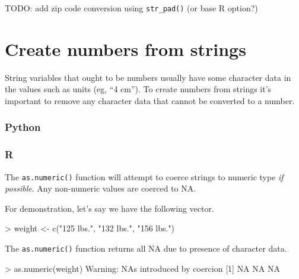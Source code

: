 \documentclass[
]{book}
\newenvironment{Shaded}{\begin{snugshade}}{\end{snugshade}}
\newcommand{\ConstantTok}[1]{\textcolor[rgb]{0.00,0.00,0.00}{#1}}
\newcommand{\DecValTok}[1]{\textcolor[rgb]{0.00,0.00,0.81}{#1}}
\newcommand{\FunctionTok}[1]{\textcolor[rgb]{0.00,0.00,0.00}{#1}}
\newcommand{\NormalTok}[1]{#1}
\newcommand{\OtherTok}[1]{\textcolor[rgb]{0.56,0.35,0.01}{#1}}
\newcommand{\SpecialCharTok}[1]{\textcolor[rgb]{0.00,0.00,0.00}{#1}}
\newcommand{\StringTok}[1]{\textcolor[rgb]{0.31,0.60,0.02}{#1}}
\begin{document}
TODO: add zip code conversion using \texttt{str\_pad()} (or base R option?)

\hypertarget{create-numbers-from-strings}{%
\section{Create numbers from strings}\label{create-numbers-from-strings}}

String variables that ought to be numbers usually have some character data in the values such as units (eg, ``4 cm''). To create numbers from strings it's important to remove any character data that cannot be converted to a number.

\hypertarget{python-19}{%
\subsubsection*{Python}\label{python-19}}

\hypertarget{r-19}{%
\subsubsection*{R}\label{r-19}}

The \texttt{as.numeric()} function will attempt to coerce strings to numeric type \emph{if possible}. Any non-numeric values are coerced to NA.

For demonstration, let's say we have the following vector.

\begin{Shaded}
\begin{Highlighting}[]
\SpecialCharTok{\textgreater{}}\NormalTok{ weight }\OtherTok{\textless{}{-}} \FunctionTok{c}\NormalTok{(}\StringTok{"125 lbs."}\NormalTok{, }\StringTok{"132 lbs."}\NormalTok{, }\StringTok{"156 lbs."}\NormalTok{)}
\end{Highlighting}
\end{Shaded}

The \texttt{as.numeric()} function returns all NA due to presence of character data.

\begin{Shaded}
\begin{Highlighting}[]
\SpecialCharTok{\textgreater{}} \FunctionTok{as.numeric}\NormalTok{(weight)}
\NormalTok{Warning}\SpecialCharTok{:}\NormalTok{ NAs introduced by coercion}
\NormalTok{[}\DecValTok{1}\NormalTok{] }\ConstantTok{NA} \ConstantTok{NA} \ConstantTok{NA}
\end{Highlighting}
\end{Shaded}
\end{document}
